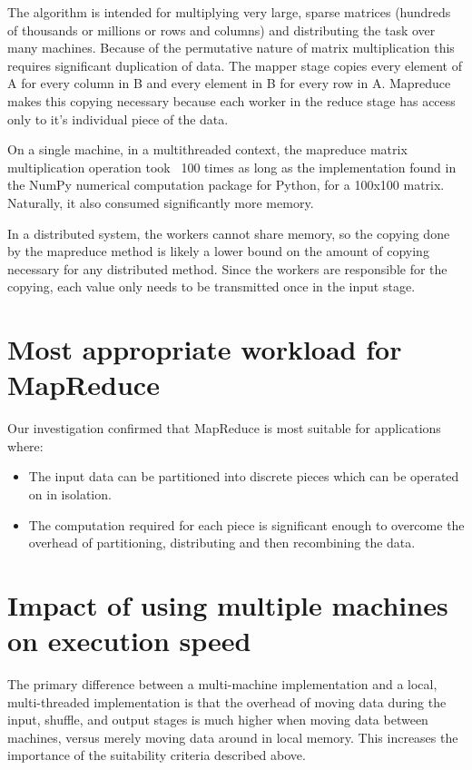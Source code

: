 \documentclass[12pt, letterpaper]{article}
\begin{document}
The algorithm is intended for multiplying very large, sparse matrices (hundreds of thousands or millions or rows and columns) and distributing the task over many machines. Because of the permutative nature of matrix multiplication this requires significant duplication of data. The mapper stage copies every element of A for every column in B and every element in B for every row in A. Mapreduce makes this copying necessary because each worker in the reduce stage has access only to it’s individual piece of the data. 

On a single machine, in a multithreaded context, the mapreduce matrix multiplication operation took ~100 times as long as the implementation found in the NumPy numerical computation package for Python, for a 100x100 matrix. Naturally, it also consumed significantly more memory. 

In a distributed system, the workers cannot share memory, so the copying done by the mapreduce method is likely a lower bound on the amount of copying necessary for any distributed method. Since the workers are responsible for the copying, each value only needs to be transmitted once in the input stage. 

	
\section{Most appropriate workload for MapReduce}
Our investigation confirmed that MapReduce is most suitable for applications where:
\begin{itemize}
\item The input data can be partitioned into discrete pieces which can be operated on in isolation. 
\item The computation required for each piece is significant enough to overcome the overhead of partitioning, distributing and then recombining the data. 
\end{itemize}
	
\section{Impact of using multiple machines on execution speed}
The primary difference between a multi-machine implementation and a local, multi-threaded implementation is that the overhead of moving data during the input, shuffle, and output stages is much higher when moving data between machines, versus merely moving data around in local memory. This increases the importance of the suitability criteria described above. 
\end{document}

